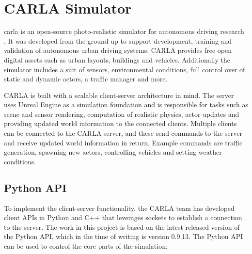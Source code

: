 \section{CARLA Simulator}

\acrfull{carla} is an open-source photo-realistic simulator for autonomous driving research \cite{introducing-carla-paper}. It was developed from the ground up to support development, training and validation of autonomous urban driving systems. CARLA provides free open digital assets such as urban layouts, buildings and vehicles. Additionally the simulator includes a suit of sensors, environmental conditions, full control over of static and dynamic actors, a traffic manager and more.

CARLA is built with a scalable client-server architecture in mind. The server uses Unreal Engine \cite{unrealengine} as a simulation foundation and is responsible for tasks such as scene and sensor rendering, computation of realistic physics, actor updates and providing updated world information to the connected clients. Multiple clients can be connected to the CARLA server, and these send commands to the server and receive updated world information in return. Example commands are traffic generation, spawning new actors, controlling vehicles and setting weather conditions.

\subsection{Python API}
To implement the client-server functionality, the CARLA team has developed client APIs in Python \cite{carla-python-api} and C++ \cite{carla-cplusplus-api} that leverages sockets to establish a connection to the server. The work in this project is based on the latest released version of the Python API, which in the time of writing is version 0.9.13. The Python API can be used to control the core parts of the simulation: 

